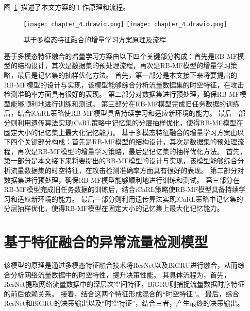 图~\ref{fig:attack_detecion_model}~描述了本文方案的工作原理和流程。
\begin{figure}[h]
	\centering
	\texttt{[image: chapter\_4.drawio.png]}
	\texttt{[image: chapter\_4.drawio.png]}
	\caption{基于多模态特征融合的增量学习方案原理及流程}
	\label{fig:attack_detecion_model}
\end{figure}
基于多模态特征融合的增量学习方案由以下四个关键部分构成：首先是RB-MF模型的结构设计，其次是数据集的预处理流程，再次是RB-MF模型的增量学习策略，最后是记忆集的抽样优化方法。
首先，第一部分是本文接下来将要提出的RB-MF模型的设计与实现，该模型能够综合分析流量数据集的时空特征，在攻击检测准确率方面具有很好的表现。
第二部分对数据集进行预处理，确保RB-MF模型能够顺利地进行训练和测试。
第三部分在RB-MF模型完成旧任务数据的训练后，结合iCaRL\cite{rebuffi2017icarl}策略使RB-MF模型具备持续学习和适应新环境的能力。
最后一部分则利用遗传算法实现iCaRL策略中记忆集的分层抽样优化，使得RB-MF模型在固定大小的记忆集上最大化记忆能力。
基于多模态特征融合的增量学习方案由以下四个关键部分构成：首先是RB-MF模型的结构设计，其次是数据集的预处理流程，再次是RB-MF模型的增量学习策略，最后是记忆集的抽样优化方法。
首先，第一部分是本文接下来将要提出的RB-MF模型的设计与实现，该模型能够综合分析流量数据集的时空特征，在攻击检测准确率方面具有很好的表现。
第二部分对数据集进行预处理，确保RB-MF模型能够顺利地进行训练和测试。
第三部分在RB-MF模型完成旧任务数据的训练后，结合iCaRL\cite{rebuffi2017icarl}策略使RB-MF模型具备持续学习和适应新环境的能力。
最后一部分则利用遗传算法实现iCaRL策略中记忆集的分层抽样优化，使得RB-MF模型在固定大小的记忆集上最大化记忆能力。

\section{基于特征融合的异常流量检测模型}
该模型的原理是通过多模态特征融合技术将ResNet以及BiGRU进行融合，从而综合分析网络流量数据中的时空特性，提升决策性能。
其具体流程为，首先，ResNet提取网络流量数据中的深层次空间特征，BiGRU则捕捉流量数据时序特征的前后依赖关系。
接着，结合这两个特征形成混合的“时空特征”。
最后，综合ResNet和BiGRU的决策输出以及“时空特征”，结合三者，产生最终的决策输出。
